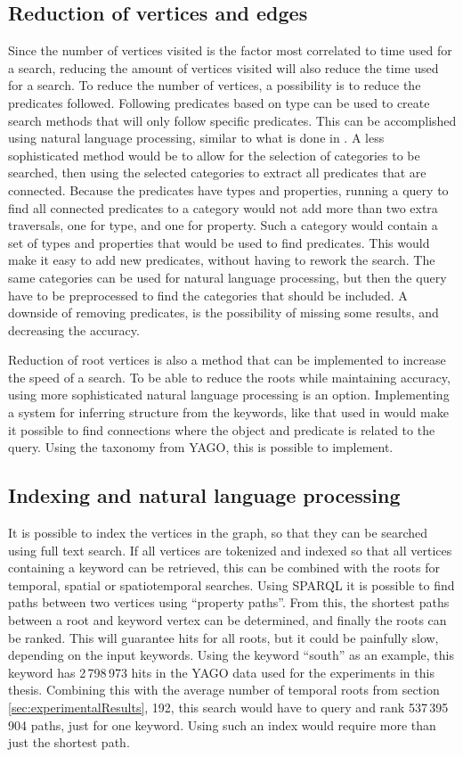 \subsection{Reduction of vertices and edges}
Since the number of vertices visited is the factor most correlated to time used for a search, reducing the amount of vertices visited will also reduce the time used for a search. To reduce the number of vertices, a possibility is to reduce the predicates followed. Following predicates based on type can be used to create search methods that will only follow specific predicates. This can be accomplished using natural language processing, similar to what is done in \cite{4812421,aqualog}. A less sophisticated method would be to allow for the selection of categories to be searched, then using the selected categories to extract all predicates that are connected. Because the predicates have types and properties, running a query to find all connected predicates to a category would not add more than two extra traversals, one for type, and one for property. Such a category would contain a set of types and properties that would be used to find predicates. This would make it easy to add new predicates, without having to rework the search. The same categories can be used for natural language processing, but then the query have to be preprocessed to find the categories that should be included. A downside of removing predicates, is the possibility of missing some results, and decreasing the accuracy.

Reduction of root vertices is also a method that can be implemented to increase the speed of a search. To be able to reduce the roots while maintaining accuracy, using more sophisticated natural language processing is an option. Implementing a system for inferring structure from the keywords, like that used in \cite{Elbassuoni:2011:KSO:2063576.2063615} would make it possible to find connections where the object and predicate is related to the query. Using the taxonomy from YAGO, this is possible to implement.

\subsection{Indexing and natural language processing}
It is possible to index the vertices in the graph, so that they can be searched using full text search. If all vertices are tokenized and indexed so that all vertices containing a keyword can be retrieved, this can be combined with the roots for temporal, spatial or spatiotemporal searches. Using SPARQL it is possible to find paths between two vertices using ``property paths''. From this, the shortest paths between a root and keyword vertex can be determined, and finally the roots can be ranked. This will guarantee hits for all roots, but it could be painfully slow, depending on the input keywords. Using the keyword ``south'' as an example, this keyword has 2\,798\,973 hits in the YAGO data used for the experiments in this thesis. Combining this with the average number of temporal roots from section \ref{sec:experimentalResults}, 192, this search would have to query and rank 537\,395\,904 paths, just for one keyword. Using such an index would require more than just the shortest path.

